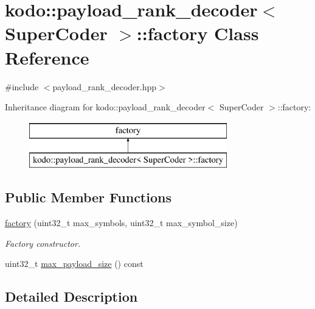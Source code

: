 \hypertarget{classkodo_1_1payload__rank__decoder_1_1factory}{\section{kodo\-:\-:payload\-\_\-rank\-\_\-decoder$<$ Super\-Coder $>$\-:\-:factory Class Reference}
\label{classkodo_1_1payload__rank__decoder_1_1factory}
}


{\ttfamily \#include $<$payload\-\_\-rank\-\_\-decoder.\-hpp$>$}

Inheritance diagram for kodo\-:\-:payload\-\_\-rank\-\_\-decoder$<$ Super\-Coder $>$\-:\-:factory\-:\begin{figure}[H]
\begin{center}
\leavevmode
\includegraphics[height=2.000000cm]{classkodo_1_1payload__rank__decoder_1_1factory}
\end{center}
\end{figure}
\subsection*{Public Member Functions}
\begin{DoxyCompactItemize}
\item 
\hyperlink{classkodo_1_1payload__rank__decoder_1_1factory_af531f262cd63099f66c723bff57760b2}{factory} (uint32\-\_\-t max\-\_\-symbols, uint32\-\_\-t max\-\_\-symbol\-\_\-size)
\begin{DoxyCompactList}\small\item\em Factory constructor. \end{DoxyCompactList}\item 
uint32\-\_\-t \hyperlink{classkodo_1_1payload__rank__decoder_1_1factory_ae7238e74d9ae5348fc5947390bb4aa0e}{max\-\_\-payload\-\_\-size} () const 
\begin{DoxyCompactList}\small\item\em \end{DoxyCompactList}\end{DoxyCompactItemize}


\subsection{Detailed Description}
